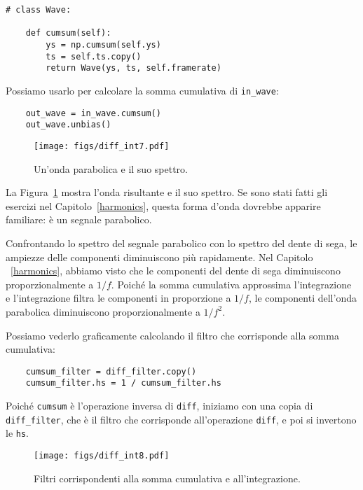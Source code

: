 \documentclass[12pt,a4paper]{book}
\begin{document}
\begin{verbatim} 
# class Wave:

    def cumsum(self):
        ys = np.cumsum(self.ys)
        ts = self.ts.copy()
        return Wave(ys, ts, self.framerate)
 \end{verbatim} 

Possiamo usarlo per calcolare la somma cumulativa di \verb"in_wave":

\begin{verbatim} 
    out_wave = in_wave.cumsum()
    out_wave.unbias()
 \end{verbatim} 

\begin{figure} 

\centerline{\texttt{[image: figs/diff\_int7.pdf]}} \caption{Un'onda parabolica e il suo spettro.} \label{fig.diff_int7} \end{figure} 

La Figura~\ref{fig.diff_int7} mostra l'onda risultante e il suo spettro. Se sono stati fatti gli esercizi nel Capitolo~\ref{harmonics}, questa forma d'onda dovrebbe apparire familiare: è un segnale parabolico.

Confrontando lo spettro del segnale parabolico con lo spettro del dente di sega, le ampiezze delle componenti diminuiscono più rapidamente. Nel Capitolo ~\ref{harmonics}, abbiamo visto che le componenti del dente di sega diminuiscono proporzionalmente a $1/f$. Poiché la somma cumulativa approssima l'integrazione e l'integrazione filtra le componenti in proporzione a $1/f$, le componenti dell'onda parabolica diminuiscono proporzionalmente a $1/f^2$.

Possiamo vederlo graficamente calcolando il filtro che corrisponde alla somma cumulativa:

\begin{verbatim} 
    cumsum_filter = diff_filter.copy()
    cumsum_filter.hs = 1 / cumsum_filter.hs
 \end{verbatim} 

Poiché {\tt cumsum} è l'operazione inversa di {\tt diff}, iniziamo con una copia di \verb"diff_filter", che è il filtro che corrisponde all'operazione {\tt diff}, e poi si invertono le {\tt hs}.

\begin{figure} 

\centerline{\texttt{[image: figs/diff\_int8.pdf]}} \caption{Filtri corrispondenti alla somma cumulativa e all'integrazione.} \label{fig.diff_int8} \end{figure} 
\end{document}
